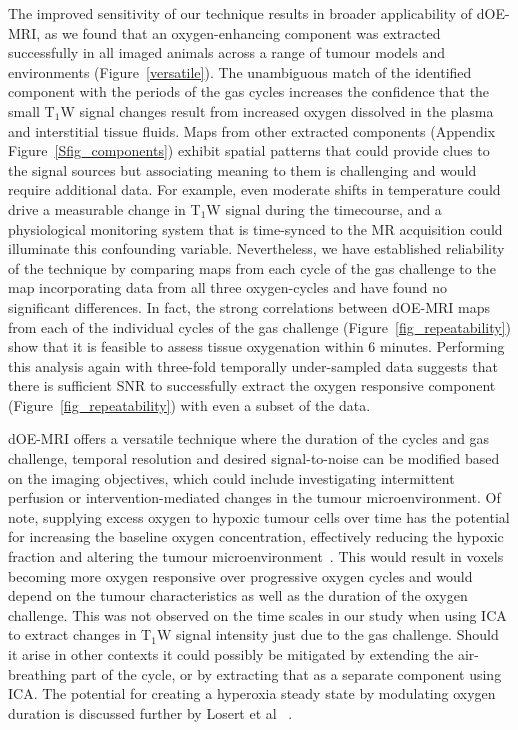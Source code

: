 The improved sensitivity of our technique results in broader applicability of dOE-MRI, as we found that an oxygen-enhancing component was extracted successfully in all imaged animals across a range of tumour models and environments (Figure~\ref{versatile}).
The unambiguous match of the identified component with the periods of the gas cycles increases the confidence that the small T$_1$W signal changes result from increased oxygen dissolved in the plasma and interstitial tissue fluids.
Maps from other extracted components (Appendix Figure~\ref{Sfig_components}) exhibit spatial patterns that could provide clues to the signal sources but associating meaning to them is challenging and would require additional data.
For example, even moderate shifts in temperature could drive a measurable change in T$_1$W signal during the timecourse, and a physiological monitoring system that is time-synced to the MR acquisition could illuminate this confounding variable. 
Nevertheless, we have established reliability of the technique by comparing maps from each cycle of the gas challenge to the map incorporating data from all three oxygen-cycles and have found no significant differences.
In fact, the strong correlations between dOE-MRI maps from each of the individual cycles of the gas challenge (Figure~\ref{fig_repeatability}) show that it is feasible to assess tissue oxygenation within 6 minutes.
Performing this analysis again with three-fold temporally under-sampled data suggests that there is sufficient SNR to successfully extract the oxygen responsive component (Figure~\ref{fig_repeatability}) with even a subset of the data.

dOE-MRI offers a versatile technique where the duration of the cycles and gas challenge, temporal resolution and desired signal-to-noise can be modified based on the imaging objectives, which could include investigating intermittent perfusion or intervention-mediated changes in the tumour microenvironment. 
Of note, supplying excess oxygen to hypoxic tumour cells over time has the potential for increasing the baseline oxygen concentration, effectively reducing the hypoxic fraction and altering the tumour microenvironment~\cite{Linnik:2013hf}.
This would result in voxels becoming more oxygen responsive over progressive oxygen cycles and would depend on the tumour characteristics as well as the duration of the oxygen challenge.
This was not observed on the time scales in our study when using ICA to extract changes in T$_1$W signal intensity just due to the gas challenge. 
Should it arise in other contexts it could possibly be mitigated by extending the air-breathing part of the cycle, or by extracting that as a separate component using ICA.
The potential for creating a hyperoxia steady state by modulating oxygen duration is discussed further by Losert et al ~\cite{Losert:2002gt}.

